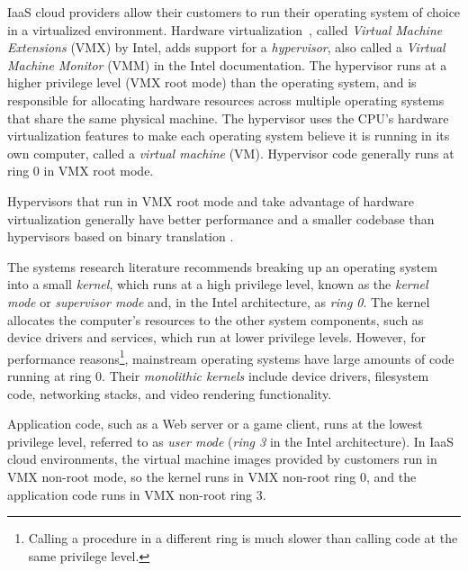 IaaS cloud providers allow their customers to run their operating system of
choice in a virtualized environment. Hardware
virtualization~\cite{uhlig2005vmx}, called \textit{Virtual Machine Extensions}
(VMX) by Intel, adds support for a \textit{hypervisor}, also called a
\textit{Virtual Machine Monitor} (VMM) in the Intel documentation. The
hypervisor runs at a higher privilege level (VMX root mode) than the operating
system, and is responsible for allocating hardware resources across multiple
operating systems that share the same physical machine. The hypervisor uses the
CPU's hardware virtualization features to make each operating system believe it
is running in its own computer, called a \textit{virtual machine} (VM).
Hypervisor code generally runs at ring 0 in VMX root mode.

Hypervisors that run in VMX root mode and take advantage of hardware
virtualization generally have better performance and a smaller codebase than
hypervisors based on binary translation \cite{rosenblum2005virtualization}.

The systems research literature recommends breaking up an operating system into
a small \textit{kernel}, which runs at a high privilege level, known as the
\textit{kernel mode} or \textit{supervisor mode} and, in the Intel
architecture, as \textit{ring 0}. The kernel allocates the computer's resources
to the other system components, such as device drivers and services, which run
at lower privilege levels. However, for performance reasons\footnote{Calling a
procedure in a different ring is much slower than calling code at the same
privilege level.}, mainstream operating systems have large amounts of code
running at ring 0. Their \textit{monolithic kernels} include device drivers,
filesystem code, networking stacks, and video rendering functionality.

Application code, such as a Web server or a game client, runs at the lowest
privilege level, referred to as \textit{user mode} (\textit{ring 3} in the
Intel architecture). In IaaS cloud environments, the virtual machine images
provided by customers run in VMX non-root mode, so the kernel runs in VMX
non-root ring 0, and the application code runs in VMX non-root ring 3.
